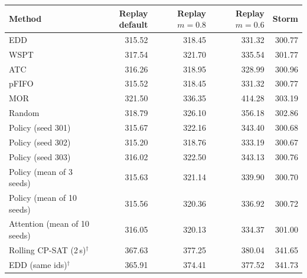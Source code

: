 \begin{tabular}{lrrrr}
\toprule
Method & Replay default & Replay $m{=}0.8$ & Replay $m{=}0.6$ & Storm \\
\midrule
EDD & 315.52 & 318.45 & 331.32 & 300.77 \\
WSPT & 317.54 & 321.70 & 335.54 & 301.77 \\
ATC & 316.26 & 318.95 & 328.99 & 300.96 \\
pFIFO & 315.52 & 318.45 & 331.32 & 300.77 \\
MOR & 321.50 & 336.35 & 414.28 & 303.19 \\
Random & 318.79 & 326.10 & 356.18 & 302.86 \\
\midrule
Policy (seed 301) & 315.67 & 322.16 & 343.40 & 300.68 \\
Policy (seed 302) & 315.20 & 318.76 & 333.19 & 300.67 \\
Policy (seed 303) & 316.02 & 322.50 & 343.13 & 300.76 \\
Policy (mean of 3 seeds) & 315.63 & 321.14 & 339.90 & 300.70 \\
\midrule
Policy (mean of 10 seeds) & 315.56 & 320.36 & 336.92 & 300.72 \\
Attention (mean of 10 seeds) & 316.05 & 320.13 & 334.37 & 301.00 \\
\midrule
Rolling CP-SAT (2\,s)$^{\dagger}$ & 367.63 & 377.25 & 380.04 & 341.65 \\
EDD (same ids)$^{\dagger}$ & 365.91 & 374.41 & 377.52 & 341.73 \\
\bottomrule
\end{tabular}
